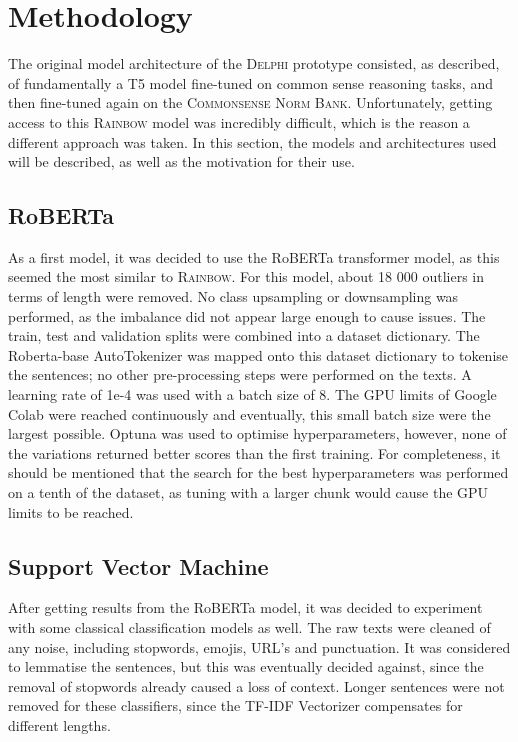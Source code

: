 \documentclass[final]{clv3} %
\begin{document}
\section{Methodology}

The original model architecture of the \textsc{Delphi} prototype consisted, as described, of fundamentally a T5 model fine-tuned on common sense reasoning tasks, and then fine-tuned again on the \textsc{Commonsense Norm Bank}. Unfortunately, getting access to this \textsc{Rainbow} \cite{lourie} model was incredibly difficult, which is the reason a different approach was taken. In this section, the models and architectures used will be described, as well as the motivation for their use.
\subsection{RoBERTa}
As a first model, it was decided to use the RoBERTa transformer model, as this seemed the most similar to \textsc{Rainbow}. For this model, about 18 000 outliers in terms of length were removed. No class upsampling or downsampling was performed, as the imbalance did not appear large enough to cause issues. The train, test and validation splits were combined into a dataset dictionary. The Roberta-base AutoTokenizer was mapped onto this dataset dictionary to tokenise the sentences; no other pre-processing steps were performed on the texts. A learning rate of 1e-4 was used with a batch size of 8. The GPU limits of Google Colab were reached continuously and eventually, this small batch size were the largest possible. Optuna \cite{akiba} was used to optimise hyperparameters, however, none of the variations returned better scores than the first training. For completeness, it should be mentioned that the search for the best hyperparameters was performed on a tenth of the dataset, as tuning with a larger chunk would cause the GPU limits to be reached.

\subsection{Support Vector Machine}

After getting results from the RoBERTa model, it was decided to experiment with some classical classification models as well. The raw texts were cleaned of any noise, including stopwords, emojis, URL’s and punctuation. It was considered to lemmatise the sentences, but this was eventually decided against, since the removal of stopwords already caused a loss of context. Longer sentences were not removed for these classifiers, since the TF-IDF Vectorizer compensates for different lengths.\\
\end{document}
